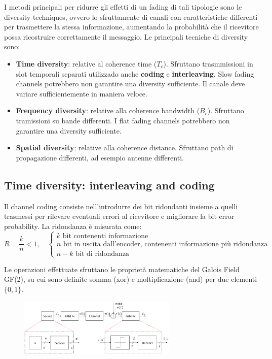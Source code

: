 I metodi principali per ridurre gli effetti di un fading di tali tipologie sono le diversity techniques, ovvero lo sfruttamente di canali con caratteristiche differenti per trasmettere la stessa informazione, aumentando la probabilità che il ricevitore possa ricostruire correttamente il messaggio.
Le principali tecniche di diversity sono:
\begin{itemize}
    \item \textbf{Time diversity}: relative al coherence time ($T_c$). Sfruttano trasmmissioni in slot temporali separati utilizzado anche \textbf{coding} e \textbf{interleaving}. Slow fading channels potrebbero non garantire una diversity sufficiente. Il canale deve variare sufficientemente in maniera veloce.
    \item \textbf{Frequency diversity}: relative alla coherence bandwidth ($B_c$). Sfruttano tramissioni su bande differenti. I flat fading channels potrebbero non garantire una diversity sufficiente.
    \item \textbf{Spatial diversity}: relative alla coherence distance. Sfruttano path di propagazione differenti, ad esempio antenne differenti.
\end{itemize}

\subsection*{Time diversity: interleaving and coding}
Il channel coding consiste nell'introdurre dei bit ridondanti insieme a quelli trasmessi per rilevare eventuali errori al ricevitore e migliorare la bit error probability.
La ridondanza è misurata come:
\[
    R = \frac{k}{n} < 1, \quad \begin{cases}
        k \text{ bit contenenti informazione} \\
        n \text{ bit in uscita dall'encoder, contenenti informazione più ridondanza} \\
        n - k \text{ bit di ridondanza}
    \end{cases}
\]

Le operazioni effettuate sfruttano le proprietà matematiche del Galois Field GF(2), su cui sono definite somma (xor) e moltiplicazione (and) per due elementi $\{0, 1\}$.

\begin{figure}[ht]
    \centering
    \includegraphics[width=0.675\textwidth]{imgs/encoder_decoder.jpg}
\end{figure}

